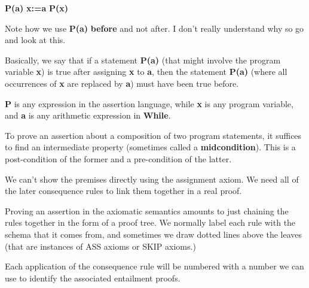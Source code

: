 \documentclass[11pt,a4paper,headsepline,titlepage,dvipsnames,cmyk]{scrartcl}
\begin{document}
\begin{center}
    {\color{blue}\textbf{P(a)}} {\color{green}\textbf{x:=a}}
    {\color{blue}\textbf{P(x)}}
\end{center}

Note how we use {\color{blue}\textbf{P(a)}} \textbf{before} and not after.
I don't really understand why so go and look at this.

Basically, we say that if a statement {\color{blue}\textbf{P(a)}} (that
might involve the program variable \textbf{x}) is true after assigning
\textbf{x} to \textbf{a}, then the statement {\color{blue}\textbf{P(a)}}
(where all occurrences of \textbf{x} are replaced by \textbf{a}) must have
been true before.

\textbf{P} is any expression in the assertion language, while \textbf{x}
is any program variable, and \textbf{a} is any arithmetic expression in
\textbf{While}.

To prove an assertion about a composition of two program statements, it
suffices to find an intermediate property (sometimes called a
\textbf{midcondition}). This is a post-condition of the former and a
pre-condition of the latter.

We can't show the premises directly using the assignment axiom. We need
all of the later consequence rules to link them together in a real proof.

Proving an assertion in the axiomatic semantics amounts to just chaining
the rules together in the form of a proof tree. We normally label each
rule with the schema that it comes from, and sometimes we draw dotted
lines above the leaves (that are instances of ASS axioms or SKIP axioms.)

Each application of the consequence rule will be numbered with a number we
can use to identify the associated entailment proofs.
\end{document}
